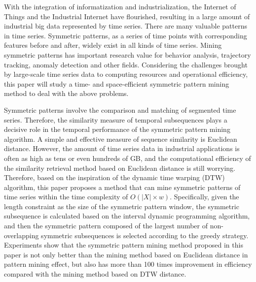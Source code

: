 \begin{abstract*}
  With the integration of informatization and industrialization, 
  the Internet of Things and the Industrial Internet have 
  flourished, resulting in a large amount of industrial big data 
  represented by time series. There are many valuable patterns 
  in time series. Symmetric patterns, as a series of time points 
  with corresponding features before and after, widely exist 
  in all kinds of time series. Mining symmetric patterns has 
  important research value for behavior analysis, trajectory 
  tracking, anomaly detection and other fields. Considering 
  the challenges brought by large-scale time series data to 
  computing resources and operational efficiency, this paper 
  will study a time- and space-efficient symmetric pattern 
  mining method to deal with the above problems.

  Symmetric patterns involve the comparison and matching of 
  segmented time series. Therefore, the similarity measure 
  of temporal subsequences plays a decisive role in the 
  temporal performance of the symmetric pattern mining algorithm. 
  A simple and effective measure of sequence similarity is 
  Euclidean distance. However, the amount of time series data 
  in industrial applications is often as high as tens or even 
  hundreds of GB, and the computational efficiency of the 
  similarity retrieval method based on Euclidean distance is 
  still worrying. Therefore, based on the inspiration of 
  the dynamic time warping (DTW) algorithm, this paper 
  proposes a method that can mine symmetric patterns of 
  time series within the time complexity of 
  $O\left( \left| X \right| \times w \right)$. 
  Specifically, given the length constraint as the size of 
  the symmetric pattern window, the symmetric subsequence 
  is calculated based on the interval dynamic programming 
  algorithm, and then the symmetric pattern composed of 
  the largest number of non-overlapping symmetric subsequences 
  is selected according to the greedy strategy. Experiments 
  show that the symmetric pattern mining method proposed 
  in this paper is not only better than the mining method 
  based on Euclidean distance in pattern mining effect, 
  but also has more than 100 times improvement in efficiency 
  compared with the mining method based on DTW distance.


\end{abstract*}
